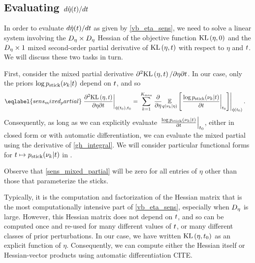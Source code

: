 \subsection{Evaluating $d\hat\eta(t) / dt$}

In order to evaluate $d\hat\eta(t) / dt$ as given by \eqref{vb_eta_sens}, we
need to solve a linear system involving the ${D_{\eta}} \times {D_{\eta}}$ Hessian of
the objective function $\mathrm{KL}\left(\eta, 0\right)$ and the ${D_{\eta}} \times 1$ mixed
second-order partial derivative of $\mathrm{KL}\left(\eta, t\right)$ with respect to $\eta$ and
$t$.  We will discuss these two tasks in turn.

First, consider the mixed partial derivative $\partial^2 \mathrm{KL}\left(\eta, t\right) /
\partial \eta \partial t$.  In our case, only the priors $\log p_{\mathrm{stick}}(\nu_{k}
\vert t)$ depend on $t$, and so
%
\begin{align}\eqlabel{sens_mixed_partial}
%
\fracat{\partial^2 \KL{\eta, \t}}
       {\partial \eta \partial \t}
       {\etaopt(\t_0), \t_0} ={}&
\sum_{\k=1}^{\kmax}
    \evalat{
        \frac{\partial}{\partial\eta}
        \expect{\q(\nuk \vert \eta)}
               {\fracat{\log \pstick(\nuk \vert \t)}{\partial \t}{\t_0}
               }
        }
        {\etaopt(\t_0)}.
%
\end{align}
%
Consequently, as long as we can explicitly evaluate $\left.\frac{\log p_{\mathrm{stick}}(\nu_{k}
\vert t)}{\partial t}\right\vert_{t_0} $, either in closed form or with automatic
differentiation, we can evaluate the mixed partial using the derivative of
\eqref{gh_integral}.  We will consider particular functional forms for
$t \mapsto p_{\mathrm{stick}}(\nu_{k} \vert t)$ in .

Observe that \eqref{sens_mixed_partial} will be zero for all entries of
$\eta$ other than those that parameterize the sticks.

Typically, it is the computation and factorization of the Hessian matrix that is
the most computationally intensive part of \eqref{vb_eta_sens}, especially when
${D_{\eta}}$ is large.  However, this Hessian matrix does not depend on $t$, and
so can be computed once and re-used for many different values of $t$, or many
different classes of prior perturbations.  In our case, we have written
$\mathrm{KL}\left(\eta, t_0\right)$ as an explicit function of $\eta$.  Consequently, we can
compute either the Hessian itself or Hessian-vector products using automatic
differentiation CITE.

